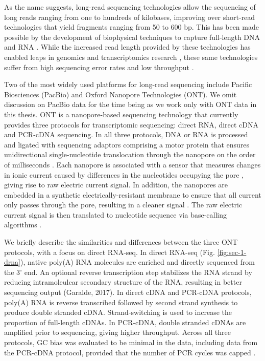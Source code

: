 As the name suggests, long-read sequencing technologies allow the sequencing of long reads ranging from one to hundreds of kilobases, improving over short-read technologies that yield fragments ranging from 50 to 600 bp. This has been made possible by the development of biophysical techniques to capture full-length DNA and RNA \cite{Weirather2017}. While the increased read length provided by these technologies has enabled leaps in genomics and transcriptomics research \cite{Bolisetty2015, Byrne2017, DeCoster2019, Liu2019, Mantere2019, Nurk2021}, these same technologies suffer from high sequencing error rates and low throughput \cite{Carneiro2012, Reuter2015, Jain2015}.  

Two of the most widely used platforms for long-read sequencing include Pacific Biosciences (PacBio) and Oxford Nanopore Technologies (ONT). We omit discussion on PacBio data for the time being as we work only with ONT data in this thesis. ONT is a nanopore-based sequencing technology that currently provides three protocols for transcriptomic sequencing: direct RNA, direct cDNA and PCR-cDNA sequencing. In all three protocols, DNA or RNA is processed and ligated with sequencing adaptors comprising a motor protein that ensures unidirectional single-nucleotide translocation through the nanopore on the order of milliseconds \cite{Jain2016}. Each nanopore is associated with a sensor that measures changes in ionic current caused by differences in the nucleotides occupying the pore \cite{Jain2016}, giving rise to raw electric current signal. In addition, the nanopores are embedded in a synthetic electrically-resistant membrane to ensure that all current only passes through the pore, resulting in a cleaner signal \cite{Wang2021}. The raw electric current signal is then translated to nucleotide sequence via base-calling algorithms \cite{Rang2018}. 

We briefly describe the similarities and differences between the three ONT protocols, with a focus on direct RNA-seq. In direct RNA-seq (Fig. \ref{fig:sec-1-drna}), native poly(A) RNA molecules are enriched and directly sequenced from the 3' end. An optional reverse transcription step stabilizes the RNA strand by reducing intramoleulcar secondary structure of the RNA, resulting in better sequencing output (Garalde, 2017). In direct cDNA and PCR-cDNA protocols, poly(A) RNA is reverse transcribed followed by second strand synthesis to produce double stranded cDNA. Strand-switching is used to increase the proportion of full-length cDNAs. In PCR-cDNA, double stranded cDNAs are amplified prior to sequencing, giving higher throughput. Across all three protocols, GC bias was evaluated to be minimal in the data, including data from the PCR-cDNA protocol, provided that the number of PCR cycles was capped \cite{ONT}. 

